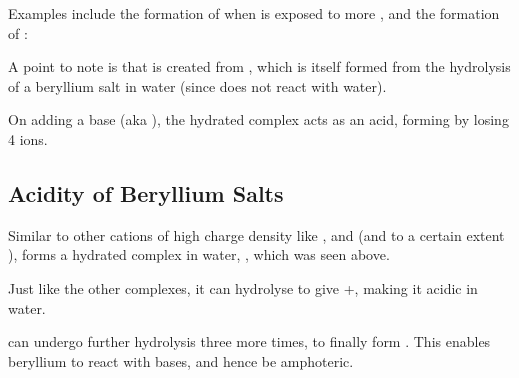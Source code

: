 				Examples include the formation of  when  is exposed to
				more , and the formation of :


				A point to note is that  is created from , which is itself formed
				from the hydrolysis of a beryllium salt in water (since  does not react with water).

				On adding a base (aka ), the hydrated  complex acts as an acid,
				forming  by losing 4  ions.



		\subsection{Acidity of Beryllium Salts}

			Similar to other cations of high charge density like ,  and  (and to
			a certain extent ),  forms a hydrated complex in water, ,
			which was seen above.

			Just like the other complexes, it can hydrolyse to give +, making it acidic in water.


			\ch{[Be(H2O)3(OH)]+} can undergo further hydrolysis three more times, to finally form .
			This enables beryllium to react with bases, and hence be amphoteric.































